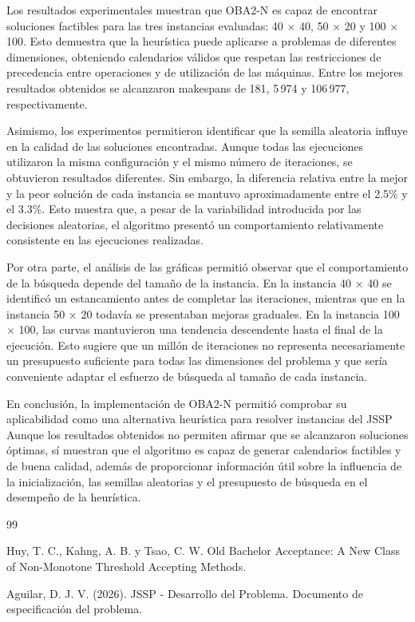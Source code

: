\documentclass[12pt,a4paper]{article}
\begin{document}
Los resultados experimentales muestran que OBA2-N es capaz de encontrar soluciones factibles para las tres instancias evaluadas: 40 $\times$ 40, 50 $\times$ 20 y 100 $\times$ 100. Esto demuestra que la heurística puede aplicarse a problemas de diferentes dimensiones, obteniendo calendarios válidos que respetan las restricciones de precedencia entre operaciones y de utilización de las máquinas. Entre los mejores resultados obtenidos se alcanzaron makespans de 181, 5\,974 y 106\,977, respectivamente.

Asimismo, los experimentos permitieron identificar que la semilla aleatoria influye en la calidad de las soluciones encontradas. Aunque todas las ejecuciones utilizaron la misma configuración y el mismo número de iteraciones, se obtuvieron resultados diferentes. Sin embargo, la diferencia relativa entre la mejor y la peor solución de cada instancia se mantuvo aproximadamente entre el 2.5\% y el 3.3\%. Esto muestra que, a pesar de la variabilidad introducida por las decisiones aleatorias, el algoritmo presentó un comportamiento relativamente consistente en las ejecuciones realizadas.

Por otra parte, el análisis de las gráficas permitió observar que el comportamiento de la búsqueda depende del tamaño de la instancia. En la instancia 40 $\times$ 40 se identificó un estancamiento antes de completar las iteraciones, mientras que en la instancia 50 $\times$ 20 todavía se presentaban mejoras graduales. En la instancia 100 $\times$ 100, las curvas mantuvieron una tendencia descendente hasta el final de la ejecución. Esto sugiere que un millón de iteraciones no representa necesariamente un presupuesto suficiente para todas las dimensiones del problema y que  sería conveniente adaptar el esfuerzo de búsqueda al tamaño de cada instancia.

En conclusión, la implementación de OBA2-N permitió comprobar su aplicabilidad como una alternativa heurística para resolver instancias del JSSP Aunque los resultados obtenidos no permiten afirmar que se alcanzaron soluciones óptimas, sí muestran que el algoritmo es capaz de generar calendarios factibles y de buena calidad, además de proporcionar información útil sobre la influencia de la inicialización, las semillas aleatorias y el presupuesto de búsqueda en el desempeño de la heurística.

\begin{thebibliography}{99}

Huy, T. C., Kahng, A. B. y Tsao, C. W. Old Bachelor Acceptance: A New Class of Non-Monotone Threshold Accepting Methods.

Aguilar, D. J. V. (2026). JSSP - Desarrollo del Problema. Documento de especificación del problema.

\end{thebibliography}
\end{document}
